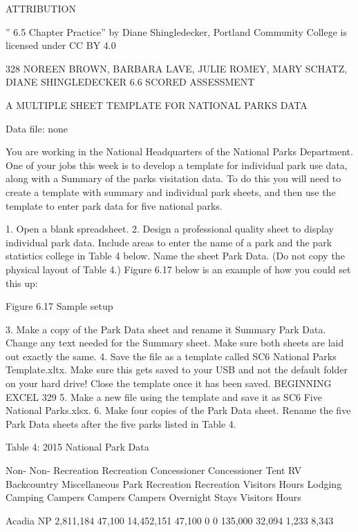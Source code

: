 ATTRIBUTION

” 6.5 Chapter Practice” by Diane Shingledecker, Portland Community College is licensed under CC
BY 4.0




328 NOREEN BROWN, BARBARA LAVE, JULIE ROMEY, MARY SCHATZ, DIANE SHINGLEDECKER
6.6 SCORED ASSESSMENT




A MULTIPLE SHEET TEMPLATE FOR NATIONAL PARKS DATA

Data file: none

You are working in the National Headquarters of the National Parks Department. One of your jobs
this week is to develop a template for individual park use data, along with a Summary of the parks
visitation data. To do this you will need to create a template with summary and individual park sheets,
and then use the template to enter park data for five national parks.

1. Open a blank spreadsheet.
2. Design a professional quality sheet to display individual park data. Include areas to enter the
name of a park and the park statistics college in Table 4 below. Name the sheet Park Data. (Do
not copy the physical layout of Table 4.) Figure 6.17 below is an example of how you could set
this up:




Figure 6.17 Sample setup

3. Make a copy of the Park Data sheet and rename it Summary Park Data. Change any text
needed for the Summary sheet. Make sure both sheets are laid out exactly the same.
4. Save the file as a template called SC6 National Parks Template.xltx. Make sure this gets saved
to your USB and not the default folder on your hard drive! Close the template once it has been
saved.
BEGINNING EXCEL 329
5. Make a new file using the template and save it as SC6 Five National Parks.xlsx.
6. Make four copies of the Park Data sheet. Rename the five Park Data sheets after the five parks
listed in Table 4.

Table 4: 2015 National Park Data

Non-                      Non-
Recreation                Recreation                Concessioner   Concessioner   Tent      RV        Backcountry   Miscellaneous
Park                       Recreation                Recreation
Visitors                  Hours                     Lodging        Camping        Campers   Campers   Campers       Overnight Stays
Visitors                  Hours

Acadia NP     2,811,184    47,100       14,452,151   47,100       0              0              135,000   32,094    1,233         8,343


